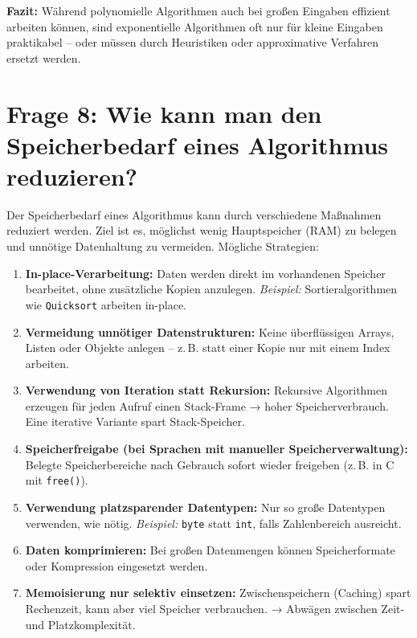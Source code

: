 \documentclass{article}
\begin{document}
\textbf{Fazit:} Während polynomielle Algorithmen auch bei großen Eingaben effizient arbeiten können, sind exponentielle Algorithmen oft nur für kleine Eingaben praktikabel – oder müssen durch Heuristiken oder approximative Verfahren ersetzt werden.

\section*{Frage 8: Wie kann man den Speicherbedarf eines Algorithmus reduzieren?}

Der Speicherbedarf eines Algorithmus kann durch verschiedene Maßnahmen reduziert werden. Ziel ist es, möglichst wenig Hauptspeicher (RAM) zu belegen und unnötige Datenhaltung zu vermeiden. Mögliche Strategien:

\begin{enumerate}
	\item \textbf{In-place-Verarbeitung:}  
	Daten werden direkt im vorhandenen Speicher bearbeitet, ohne zusätzliche Kopien anzulegen.  
	\textit{Beispiel:} Sortieralgorithmen wie \texttt{Quicksort} arbeiten in-place.
	
	\item \textbf{Vermeidung unnötiger Datenstrukturen:}  
	Keine überflüssigen Arrays, Listen oder Objekte anlegen – z.\,B. statt einer Kopie nur mit einem Index arbeiten.
	
	\item \textbf{Verwendung von Iteration statt Rekursion:}  
	Rekursive Algorithmen erzeugen für jeden Aufruf einen Stack-Frame → hoher Speicherverbrauch.  
	Eine iterative Variante spart Stack-Speicher.
	
	\item \textbf{Speicherfreigabe (bei Sprachen mit manueller Speicherverwaltung):}  
	Belegte Speicherbereiche nach Gebrauch sofort wieder freigeben (z.\,B. in C mit \texttt{free()}).
	
	\item \textbf{Verwendung platzsparender Datentypen:}  
	Nur so große Datentypen verwenden, wie nötig.  
	\textit{Beispiel:} \texttt{byte} statt \texttt{int}, falls Zahlenbereich ausreicht.
	
	\item \textbf{Daten komprimieren:}  
	Bei großen Datenmengen können Speicherformate oder Kompression eingesetzt werden.
	
	\item \textbf{Memoisierung nur selektiv einsetzen:}  
	Zwischenspeichern (Caching) spart Rechenzeit, kann aber viel Speicher verbrauchen.  
	→ Abwägen zwischen Zeit- und Platzkomplexität.
\end{enumerate}
\end{document}
